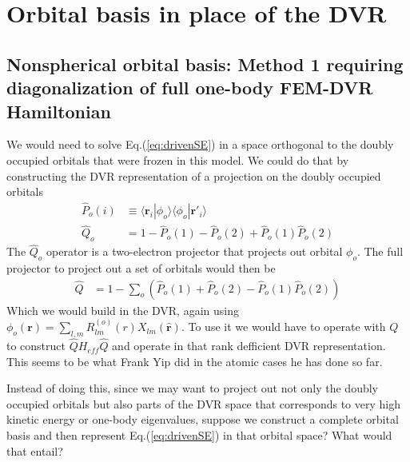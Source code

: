 \documentclass[%
pra%
,twocolumn%
,amssymb, nobibnotes, aps,
longbibliography
]{revtex4-1}
\begin{document}
\section{Orbital basis in place of the DVR}
\label{sec:orbbasis}

\subsection{Nonspherical orbital basis: Method 1 requiring diagonalization of full one-body FEM-DVR Hamiltonian}
\label{sec:nonspherical}

We would need to solve Eq.(\ref{eq:drivenSE}) in a space orthogonal to the doubly occupied orbitals that were frozen in this model.  We could do that by constructing the DVR representation of a projection on the doubly occupied orbitals
\begin{equation}
\begin{split}
\hat{P}_o(i) & \equiv  \langle \mathbf{r}_i | \phi_o \rangle \langle \phi_o|\mathbf{r'}_i \rangle \\
\hat{Q}_o &= 1 - \hat{P}_o(1) -  \hat{P}_o(2 ) + \hat{P}_o(1)\hat{P}_o(2)
\end{split}
\end{equation}
The $\hat{Q}_o$ operator is a two-electron projector that projects out orbital $\phi_o$. The full projector to project out a set of orbitals would then be
\begin{equation}
\begin{split}
\hat{Q}&= 1 - \sum_o (  \hat{P}_o(1) +  \hat{P}_o(2 ) - \hat{P}_o(1)\hat{P}_o(2))
\end{split}
\end{equation}
Which we would build in the DVR, again using $\phi_o(\mathbf{r}) = \sum_{l,m} R^{(o)}_{lm}(r) X_{lm} (  \mathbf{\hat{r}} )$.  To use it we would have to operate with $Q$ to construct $\hat{Q} H_{eff} \hat{Q}$ and operate in that rank defficient DVR representation.  This seems to be what Frank Yip did in the atomic cases he has done so far.

Instead of doing this, since we may want to project out not only the doubly occupied orbitals but also parts of the DVR space that corresponds to very high kinetic energy or one-body eigenvalues, suppose we construct a complete orbital basis and then represent Eq.(\ref{eq:drivenSE}) in that orbital space?  What would that entail?
\end{document}
